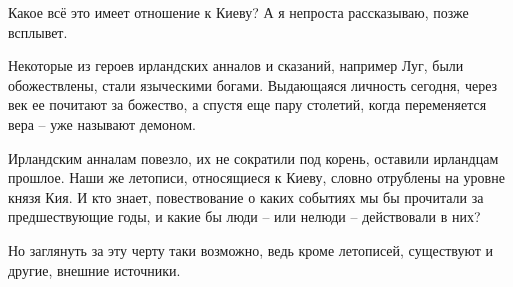 Какое всё это имеет отношение к Киеву? А я непроста рассказываю, позже всплывет.

Некоторые из героев ирландских анналов и сказаний, например Луг, были обожествлены, стали языческими богами. Выдающаяся личность сегодня, через век ее почитают за божество, а спустя еще пару столетий, когда переменяется вера – уже называют демоном. 

Ирландским анналам повезло, их не сократили под корень, оставили ирландцам прошлое. Наши же летописи, относящиеся к Киеву, словно отрублены на уровне князя Кия. И кто знает, повествование о каких событиях мы бы прочитали за предшествующие годы, и какие бы люди – или нелюди – действовали в них?

Но заглянуть за эту черту таки возможно, ведь кроме летописей, существуют и другие, внешние источники.
